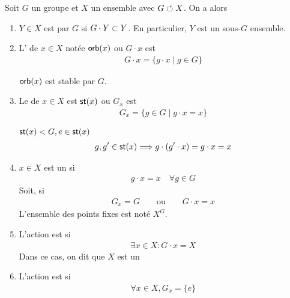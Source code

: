 \documentclass[french,a4paper,10pt]{article}
\begin{document}
	\begin{definition}
		Soit $G$ un groupe et $X$ un ensemble avec $G\circlearrowleft X$. On a alors
		\begin{enumerate}[label=$(\roman*)$]
			\item $Y\in X$ est  par $G$ si $G\cdot Y\subset Y$. En particulier, $Y$ est un sous-$G$ ensemble.
			
			\item L' de $x\in X$ notée $\operatorname{\mathsf{orb}}(x)$ ou $G\cdot x$ est
				\[\begin{aligned}
					G\cdot x = \{g\cdot x\mid g\in G\}
				\end{aligned}\]
				\begin{myremark}
					$\operatorname{\mathsf{orb}}(x)$ est stable par $G$.
				\end{myremark}
			
			\item Le  de $x\in X$ est $\operatorname{\mathsf{st}}(x)$ ou $G_x$ est 
				\[\begin{aligned}
					G_x=\{g\in G\mid g\cdot x=x\}
				\end{aligned}\]
				\begin{myremark}
					$\operatorname{\mathsf{st}}(x)<G,e\in\operatorname{\mathsf{st}}(x)$
					\[\begin{aligned}
						g,g'\in \operatorname{\mathsf{st}}(x)\Longrightarrow g\cdot(g'\cdot x)=g\cdot x=x
					\end{aligned}\]
				\end{myremark}
			\item $x\in X$ est un  si 
				\[\begin{aligned}
					g\cdot x=x\quad \forall g\in G
				\end{aligned}\]
				Soit, si 
					\[\begin{aligned}
						G_x=G\qquad \text{ou}\qquad G\cdot x=x
					\end{aligned}\]
				L'ensemble des points fixes est noté $X^G$.
				
			\item L'action est  si 
				\[\begin{aligned}
					\exists x\in X\colon G\cdot x=X
				\end{aligned}\]
				Dans ce cas, on dit que $X$ est un 
				
			\item L'action est  si 
				\[\begin{aligned}
					\forall x\in X, G_x=\{e\}
				\end{aligned}\]
		\end{enumerate}
	\end{definition}
\end{document}
